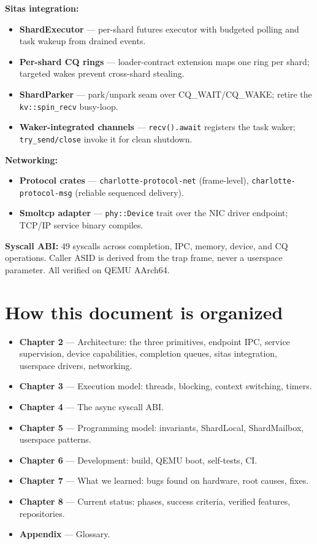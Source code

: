 \textbf{Sitas integration:}
\begin{itemize}
    \item \textbf{ShardExecutor} --- per-shard futures executor with budgeted
        polling and task wakeup from drained events.
    \item \textbf{Per-shard CQ rings} --- loader-contract extension maps one
        ring per shard; targeted wakes prevent cross-shard stealing.
    \item \textbf{ShardParker} --- park/unpark seam over CQ\_WAIT/CQ\_WAKE;
        retire the \texttt{kv::spin\_recv} busy-loop.
    \item \textbf{Waker-integrated channels} --- \texttt{recv().await} registers
        the task waker; \texttt{try\_send/close} invoke it for clean shutdown.
\end{itemize}

\textbf{Networking:}
\begin{itemize}
    \item \textbf{Protocol crates} --- \texttt{charlotte-protocol-net}
        (frame-level), \texttt{charlotte-protocol-msg} (reliable sequenced
        delivery).
    \item \textbf{Smoltcp adapter} --- \texttt{phy::Device} trait over the NIC
        driver endpoint; TCP/IP service binary compiles.
\end{itemize}

\textbf{Syscall ABI:} 49 syscalls across completion, IPC, memory, device, and
CQ operations. Caller ASID is derived from the trap frame, never a userspace
parameter. All verified on QEMU AArch64.

\section{How this document is organized}

\begin{itemize}
    \item \textbf{Chapter 2} --- Architecture: the three primitives, endpoint
        IPC, service supervision, device capabilities, completion queues, sitas
        integration, userspace drivers, networking.
    \item \textbf{Chapter 3} --- Execution model: threads, blocking, context
        switching, timers.
    \item \textbf{Chapter 4} --- The async syscall ABI.
    \item \textbf{Chapter 5} --- Programming model: invariants, ShardLocal,
        ShardMailbox, userspace patterns.
    \item \textbf{Chapter 6} --- Development: build, QEMU boot, self-tests, CI.
    \item \textbf{Chapter 7} --- What we learned: bugs found on hardware, root
        causes, fixes.
    \item \textbf{Chapter 8} --- Current status: phases, success criteria,
        verified features, repositories.
    \item \textbf{Appendix} --- Glossary.
\end{itemize}

